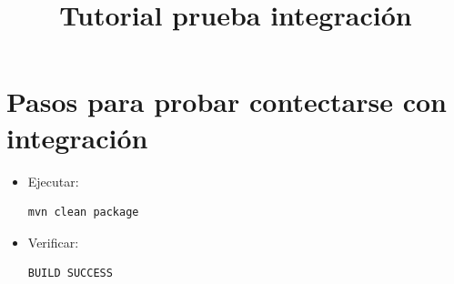 \documentclass[12pt]{article}
\title{Tutorial prueba integraci\'on}
\begin{document}
\maketitle
\clearpage
\section{Pasos para probar contectarse con integraci\'on}

\begin{itemize}
\item Ejecutar: %
\begin{verbatim}
mvn clean package
\end{verbatim}
\begin{minipage}[t]{\linewidth}
          \raggedright

          \medskip
          
    \end{minipage}
\item Verificar: %
\begin{verbatim}
BUILD SUCCESS
\end{verbatim}
\begin{minipage}[t]{\linewidth}
          \raggedright


\end{minipage}
\end{itemize}
\end{document}
